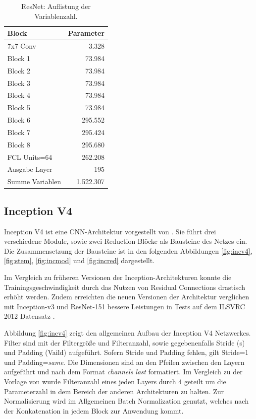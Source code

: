 \begin{table}[ht]
\centering
\caption{ResNet: Auflistung der Variablenzahl.}
\begin{tabular}{@{}lr@{}}
\hline
Block & Parameter\\
\hline
7x7 Conv &  3.328\\
Block 1 & 73.984\\
Block 2 & 73.984\\
Block 3 & 73.984\\
Block 4 & 73.984\\
Block 5 & 73.984\\
Block 6 & 295.552\\
Block 7 & 295.424\\
Block 8 & 295.680\\
FCL Units=64 & 262.208\\
Ausgabe Layer & 195\\
\hline
Summe Variablen & 1.522.307\\
\hline
\end{tabular}
\label{tb:resnet}
\end{table}

\subsection{Inception V4}
\label{sek:incv4}
Inception V4 ist eine CNN-Architektur vorgestellt von \textcite{DBLP:journals/corr/SzegedyIV16}. Sie führt drei verschiedene Module, sowie zwei Reduction-Blöcke als Bausteine des Netzes ein. Die Zusammensetzung der Bausteine ist in den folgenden Abbildungen \ref{fig:incv4}, \ref{fig:stem}, \ref{fig:incmod} und \ref{fig:incred} dargestellt.

Im Vergleich zu früheren Versionen der Inception-Architekturen konnte die Trainingsgeschwindigkeit durch das Nutzen von Residual Connections drastisch erhöht werden. Zudem erreichten die neuen Versionen der Architektur verglichen mit Inception-v3 und ResNet-151 bessere Leistungen in Tests auf dem ILSVRC 2012 Datensatz \parencite{DBLP:journals/corr/SzegedyIV16}. 

Abbildung \ref{fig:incv4} zeigt den allgemeinen Aufbau der Inception V4 Netzwerkes. Filter sind mit der Filtergröße und Filteranzahl, sowie gegebenenfalls Stride (s) und Padding (Vaild) aufgeführt. Sofern Stride und Padding fehlen, gilt Stride=1 und Padding=\textit{same}. Die Dimensionen sind an den Pfeilen zwischen den Layern aufgeführt und nach dem Format \textit{channels last} formatiert. Im Vergleich zu der Vorlage von \textcite{DBLP:journals/corr/SzegedyIV16} wurde Filteranzahl eines jeden Layers durch 4 geteilt um die Parameterzahl in dem Bereich der anderen Architekturen zu halten. Zur Normalisierung wird im Allgemeinen Batch Normalization genutzt, welches nach der Konkatenation in jedem Block zur Anwendung kommt.

